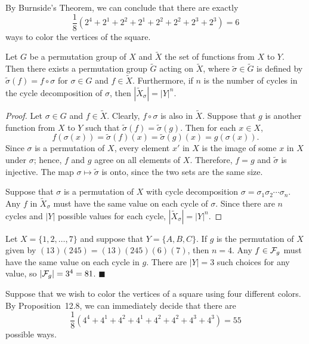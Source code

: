 By Burnside's Theorem, we can conclude that there are exactly
$$
\frac{1}{8} ( 2^4 + 2^1 + 2^2 + 2^1  + 2^2 + 2^2 +2^3 + 2^3)
= 6
$$
ways to color the vertices of the square.
 
 
\begin{proposition}
Let $G$ be a permutation group of $X$ and $\widetilde{X}$ the set of
functions from $X$ to $Y$. Then there exists a permutation group 
$\widetilde{G}$ acting on $\widetilde{X}$, where $\widetilde{\sigma} 
\in \widetilde{G}$ is defined by $\widetilde{\sigma}(f) = f \circ 
\sigma$ for $\sigma \in G$ and $f \in \widetilde{X}$. Furthermore, 
if $n$ is the number of cycles in the cycle decomposition 
of $\sigma$, then $|\widetilde{X}_{\sigma}| = |Y|^n$. 
\end{proposition}
 
 
\begin{proof}
Let $\sigma \in G$ and $f \in  \widetilde{X}$. Clearly, $f \circ
\sigma$ is also in $\widetilde{X}$. Suppose that $g$ is another
function from $X$ to $Y$ such that $\widetilde{\sigma}(f) =
\widetilde{\sigma}(g)$. Then for each $x \in X$,
$$
f( \sigma(x ))
= \widetilde{\sigma}(f)(x)
= \widetilde{\sigma}(g)(x)
= g( \sigma(x )).
$$
Since $\sigma$ is a permutation of $X$, every element $x'$ in $X$ is
the image of some $x$ in $X$ under $\sigma$; hence, $f$ and $g$ agree
on all elements of $X$. Therefore, $f=g$ and $\widetilde{\sigma}$ is
injective.  The map $\sigma \mapsto \widetilde{\sigma}$ is onto, since
the two sets are the same size.
 
 
Suppose that $\sigma$ is a permutation of $X$ with cycle decomposition
$\sigma = \sigma_1 \sigma_2 \cdots \sigma_n$. Any $f$ in
${\widetilde{X}}_{\sigma}$ must have the same value on each cycle of
$\sigma$. Since there are $n$ cycles and $|Y|$ possible values for
each cycle, $|{\widetilde{X}}_{\sigma}| = |Y|^n$.
\end{proof}
 
 
\medskip
 
 
Let $X = \{1, 2, \ldots, 7\}$ and suppose that $Y = \{ A, B, C \}$. If
$g$ is the permutation of $X$ given by $(1 3)(2 4 5) = (1 3)(2 4
5)(6)(7)$, then $n = 4$. Any $f \in {\cal F}_g$ must have the same
value on each cycle in $g$. There are $|Y|=3$ such choices for any
value, so $|{\cal F}_g|  = 3^4 = 81$.
\hspace{\fill} $\blacksquare$
 
 
\vspace{ 2 ex}
 
 
Suppose that we wish to color the vertices of a square using four
different colors. By Proposition~12.8, we can immediately
decide that there are 
$$
\frac{1}{8} (4^4 + 4^1 + 4^2 + 4^1 + 4^2 + 4^ 2 + 4^3 + 4^3)
=55
$$
possible ways.
 
